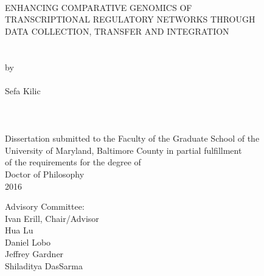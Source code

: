 
\thispagestyle{empty}
\hbox{\ }
\vspace{1in}
\renewcommand{\baselinestretch}{1}
\small\normalsize
\begin{center}

\large{{ENHANCING COMPARATIVE GENOMICS OF \\
TRANSCRIPTIONAL REGULATORY NETWORKS THROUGH\\
DATA COLLECTION, TRANSFER AND INTEGRATION}}\\
\ \\
\ \\
\large{by} \\
\ \\
\large{Sefa Kilic}%
\ \\
\ \\
\ \\
\ \\
\normalsize
Dissertation submitted to the Faculty of the Graduate School of the \\
University of Maryland, Baltimore County in partial fulfillment \\
of the requirements for the degree of \\
Doctor of Philosophy \\
2016
\end{center}

\vspace{7.5em}

\noindent Advisory Committee: \\
Ivan Erill, Chair/Advisor \\
Hua Lu \\
Daniel Lobo \\
Jeffrey Gardner \\
Shiladitya DasSarma
